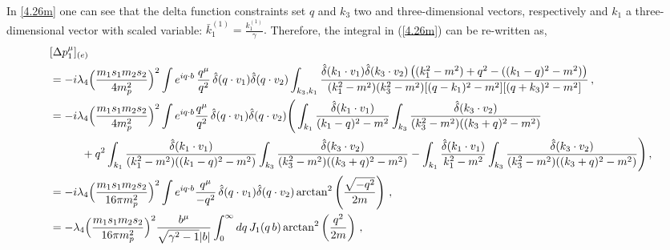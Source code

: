 In \eqref{4.26m} one can see that the delta function constraints set $q$ and $k_3$ two and three-dimensional vectors, respectively and $k_1$ a three-dimensional vector with scaled variable: $
        \bar k_1^{(1)}=\frac{k_1^{(1)}}{\gamma}.
   $ 
Therefore, the integral in  (\ref{4.26m}) can be re-written as,
\begin{align}
\begin{split}
   &   [\Delta p_1^{\mu}]_{(e)}\\ &=-i\lambda_4\Big(\frac{m_1s_1m_2s_2}{4m_p^2}\Big)^2 \int e^{iq\cdot b}\,\frac{q^\mu}{q^2}\,\hat \delta(q\cdot v_1)\hat\delta(q\cdot v_2)\int_{k_3,k_1}\frac{\hat\delta(k_1\cdot v_1)\hat\delta(k_3\cdot v_2)\left((k_1^2-m^2)+q^2-((k_1-q)^2-m^2)\right)}{(k_1^2-m^2)(k_3^2-m^2)[(q-k_1)^2-m^2][(q+k_3)^2-m^2]}\,, \\ &
   =-i\lambda_4\Big(\frac{m_1s_1m_2s_2}{4m_p^2}\Big)^2\int e^{iq\cdot b} \frac{q^\mu}{q^2}\,\hat \delta(q\cdot v_1)\hat\delta(q\cdot v_2)\Bigg(\int_{k_1}\frac{\hat\delta(k_1\cdot v_1)}{(k_1-q)^2-m^2}\int_{k_3}\frac{\hat\delta(k_3\cdot v_2)}{(k_3^2-m^2)((k_3+q)^2-m^2)}\\ & \hspace{1 cm}+q^2\int_ {k_1}\frac{\hat\delta(k_1\cdot v_1)}{(k_1^2-m^2)((k_1-q)^2-m^2)}\int _{k_3}\frac{\hat\delta(k_3\cdot v_2)}{(k_3^2-m^2)((k_3+q)^2-m^2)}-\int_{k_1}\frac{\hat\delta(k_1\cdot v_1)}{k_1^2-m^2}\int_{k_3}\frac{\hat\delta(k_3\cdot v_2)}{(k_3^2-m^2)((k_3+q)^2-m^2)}\Bigg)\,,\\ &
   =-i\lambda_4\Big(\frac{m_1s_1m_2s_2}{16\pi m_p^2}\Big)^2\int e^{iq\cdot b} \frac{q^\mu}{-q^2}\,\hat \delta(q\cdot v_1)\hat\delta(q\cdot v_2)\arctan^2\left(\frac{\sqrt{-q^2}}{2m}\right)\,,\\ &
  =- \lambda_4\Big(\frac{m_1s_1m_2s_2}{16\pi m_p^2}\Big)^2\frac{b^\mu}{\sqrt{\gamma^2-1}|b|} \int_0^\infty dq\, J_{1}(q\,b)\arctan^2\left(\frac{q^2}{2m}\right)\,,
   \label{4.19f}
    \end{split}
\end{align}
